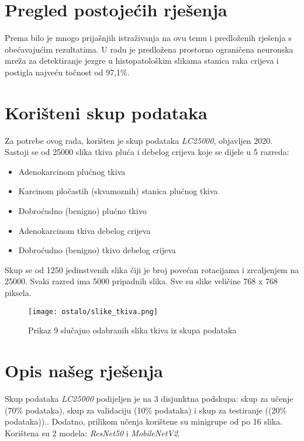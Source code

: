 \documentclass[conference, utf8]{IEEEtran}
\begin{document}
\pagebreak[1]

\section{Pregled postojećih rješenja}
Prema \cite{mehmood2022malignancy} bilo je mnogo prijašnjih istraživanja na ovu temu i predloženih rješenja s obećavajućim rezultatima. U radu \cite{Sirinukunwattana} je predložena prostorno ograničena neuronska mreža za detektiranje jezgre u histopatološkim slikama stanica raka crijeva i postigla najveću točnost od 97,1\%.




\section{Korišteni skup podataka}
Za potrebe ovog rada, korišten je skup podataka \textit{LC25000}, objavljen 2020. \cite{borkowski2019lung} Sastoji se od 25000 slika tkiva pluća i debelog crijeva koje se dijele u 5 razreda:
\begin{itemize}
	\item Adenokarcinom plućnog tkiva
	\item Karcinom pločastih (skvamoznih) stanica plućnog tkiva
	\item Dobroćudno (benigno) plućno tkivo
	\item Adenokarcinom tkiva debelog crijeva
	\item Dobroćudno (benigno) tkivo debelog crijeva
\end{itemize}


Skup se od 1250 jedinstvenih slika čiji je broj povećan rotacijama i zrcaljenjem na 25000. Svaki razred ima 5000 pripadnih slika. Sve su slike veličine 768 x 768 piksela. 

\begin{figure}[ht]
	\centering
	\texttt{[image: ostalo/slike\_tkiva.png]}
	\caption{Prikaz 9 slučajno odabranih slika tkiva iz skupa podataka}
	\label{fig:tissue_images}
\end{figure}


\section{Opis našeg rješenja}
Skup podataka \textit{LC25000} podijeljen je na 3 disjunktna podskupa: skup za učenje (70\% podataka), skup za validaciju (10\% podataka) i skup za testiranje ((20\% podataka)).. Dodatno, prilikom učenja korištene su minigrupe od po 16 slika. Korištena su 2 modela: \textit{ResNet50} i \textit{MobileNetV2}. 
\end{document}
